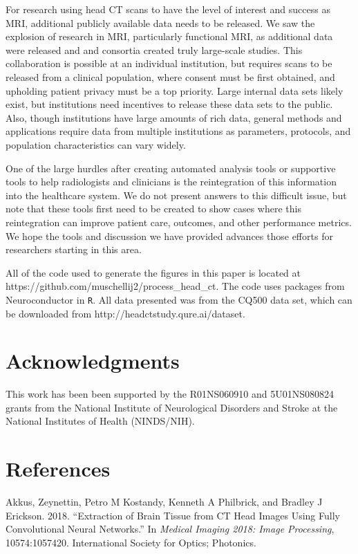 \documentclass[]{elsarticle} %
\begin{document}
For research using head CT scans to have the level of interest and success as MRI, additional publicly available data needs to be released. We saw the explosion of research in MRI, particularly functional MRI, as additional data were released and and consortia created truly large-scale studies. This collaboration is possible at an individual institution, but requires scans to be released from a clinical population, where consent must be first obtained, and upholding patient privacy must be a top priority. Large internal data sets likely exist, but institutions need incentives to release these data sets to the public. Also, though institutions have large amounts of rich data, general methods and applications require data from multiple institutions as parameters, protocols, and population characteristics can vary widely.

One of the large hurdles after creating automated analysis tools or supportive tools to help radiologists and clinicians is the reintegration of this information into the healthcare system. We do not present answers to this difficult issue, but note that these tools first need to be created to show cases where this reintegration can improve patient care, outcomes, and other performance metrics. We hope the tools and discussion we have provided advances those efforts for researchers starting in this area.

All of the code used to generate the figures in this paper is located at https://github.com/muschellij2/process\_head\_ct. The code uses packages from Neuroconductor in \texttt{R}. All data presented was from the CQ500 data set, which can be downloaded from http://headctstudy.qure.ai/dataset.

\hypertarget{acknowledgments}{%
\section{Acknowledgments}\label{acknowledgments}}

This work has been been supported by the R01NS060910 and 5U01NS080824 grants from the National Institute of Neurological Disorders and Stroke at the National Institutes of Health (NINDS/NIH).

\hypertarget{references}{%
\section*{References}\label{references}}

\hypertarget{refs}{}
\leavevmode\hypertarget{ref-ct_bet}{}%
Akkus, Zeynettin, Petro M Kostandy, Kenneth A Philbrick, and Bradley J Erickson. 2018. ``Extraction of Brain Tissue from CT Head Images Using Fully Convolutional Neural Networks.'' In \emph{Medical Imaging 2018: Image Processing}, 10574:1057420. International Society for Optics; Photonics.
\end{document}
